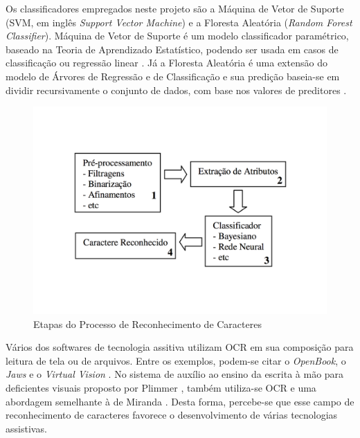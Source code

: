 Os classificadores empregados neste projeto são a Máquina de Vetor de Suporte (SVM, em inglês \textit{Support Vector Machine}) e a Floresta Aleatória (\textit{Random Forest Classifier}). Máquina de Vetor de Suporte é um modelo classificador paramétrico, baseado na Teoria de Aprendizado Estatístico, podendo ser usada em casos de classificação ou regressão linear . Já a Floresta Aleatória é uma extensão do modelo de Árvores de Regressão e de Classificação e sua predição baseia-se em dividir recursivamente o conjunto de dados, com base nos valores de preditores .

\begin{figure}[H]
  \centering
  \includegraphics[width=0.7\linewidth]{figuras/etapaProcessamento.pdf}
  \caption{Etapas do Processo de Reconhecimento de Caracteres }
  \label{fig:etapas}
\end{figure}

Vários dos softwares de tecnologia assitiva utilizam OCR em sua composição para leitura de tela ou de arquivos. Entre os exemplos, podem-se citar o \textit{OpenBook}, o \textit{Jaws} e o \textit{Virtual Vision}   . No sistema de auxílio ao ensino da escrita à mão para deficientes visuais proposto por Plimmer , também utiliza-se OCR e uma abordagem semelhante à de Miranda . Desta forma, percebe-se que esse campo de reconhecimento de caracteres favorece o desenvolvimento de várias tecnologias assistivas.

